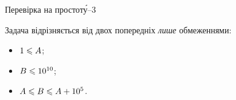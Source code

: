 \begin{problemAllDefault}{Перевірка на простот\'{у}--3}

Задача відрізняється від двох попередніх \emph{лише} обмеженнями:

\vspace{-0.5\baselineskip}

\begin{multicols}{3}
\begin{itemize}
\item
$1\leqslant A$;
\item
$B\leqslant10^{10}$;
\item
$A\leqslant B\leqslant A+10^5$.
\end{itemize}
\end{multicols}

\vspace{-0.5\baselineskip}

\end{problemAllDefault}